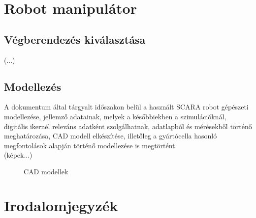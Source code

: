 \documentclass{article}
\begin{document}
\section{Robot manipulátor}

\subsection{Végberendezés kiválasztása}
(...)

\subsection{Modellezés}
A dokumentum által tárgyalt időszakon belül a használt SCARA robot gépészeti modellezése, jellemző adatainak, melyek
a későbbiekben a szimulációknál, digitális ikernél releváns adatként szolgálhatnak, adatlapból és mérésekből történő 
meghatározása, CAD modell elkészítése, illetőleg a gyártócella hasonló megfontolások alapján történő modellezése 
is megtörtént.\\
(képek...)
\begin{figure}[h]
    \centering
    \caption{CAD modellek}
\end{figure}


\section{Irodalomjegyzék}
\end{document}
